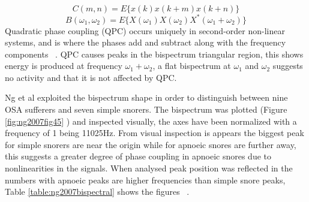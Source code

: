\begin{equation}
\label{Cummulant}
C(m,n)=E\{x(k)x(k+m)x(k+n)\}
\end{equation}
\begin{equation}
\label{bispectral}
B(\omega_1,\omega_2) = E\{X(\omega_1)X(\omega_2)X^*(\omega_1+\omega_2)\}
\end{equation}
Quadratic phase coupling (QPC) occurs uniquely in second-order non-linear systems, and is where the phases add and subtract along with the frequency components ~\cite{rastogi2005quadratic}. QPC causes peaks in the bispectrum triangular region, this shows energy is produced at frequency $\omega_1 + \omega_2$, a flat bispectrum at $\omega_1$ and $\omega_2$ suggests no activity and that it is not affected by QPC. 

Ng et al exploited the bispectrum shape in order to distinguish between nine OSA sufferers and seven simple snorers. The bispectrum was plotted (Figure \ref{fig:ng2007fig45} ) and inspected visually, the axes have been normalized with a frequency of 1 being 11025Hz. From visual inspection is appears the biggest peak for simple snorers are near the origin while for apnoeic snores are further away, this suggests a greater degree of phase coupling in apnoeic snores due to nonlinearities in the signals. When analysed peak position was reflected in the numbers with apnoeic peaks are higher frequencies than simple snore peaks, Table \ref{table:ng2007bispectral} shows the figures ~\cite{ng2007bispectral}.

